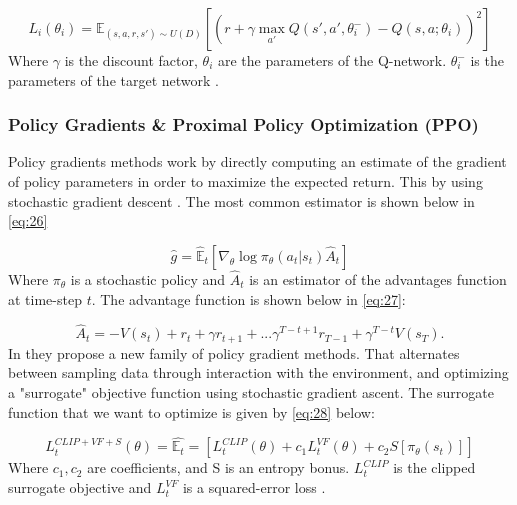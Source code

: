 \documentclass{kththesis}
\theoremstyle{definition}
\begin{document}
\begin{equation}
    \label{eq:25}
    L_i(\theta_i) = \mathbb{E}_{(s,a,r,s') \sim U(D)} \left[\left(r+ \gamma \underset{a'}{\operatorname{max}}Q(s', a', \theta_{i}^{-})-Q(s,a;\theta_i)  \right)^2 \right]
\end{equation}
Where $\gamma$ is the discount factor, $\theta_i$ are the parameters of the Q-network. $\theta_{i}^{-}$ is the parameters of the target network \parencite{mnih2015human}.


\subsubsection*{Policy Gradients \& Proximal Policy Optimization (PPO)}
Policy gradients methods work by directly computing an estimate of the gradient of policy parameters in order to maximize the expected return. This by using stochastic gradient descent \parencite{bansal2017emergent, schulman2017proximal}. The most common estimator is shown below in \autoref{eq:26}

\begin{equation}
    \label{eq:26}
    \hat{g} = \hat{\mathbb{E}}_{t}\left[\nabla_{\theta} \log{\pi_{\theta}(a_t|s_t)\hat{A}_{t}} \right]
\end{equation}
Where $\pi_{\theta}$ is a stochastic policy and $\hat{A}_{t}$ is an estimator of the advantages function at time-step $t$. The advantage function is shown below in \autoref{eq:27}:

\begin{equation}
    \label{eq:27}
    \hat{A}_{t} = -V(s_t) + r_t +\gamma r_{t+1} + ... \gamma^{T-t+1} r_{T-1} + \gamma^{T-t}V(s_T).
\end{equation}
In \textcite{schulman2017proximal} they propose a new family of policy gradient methods. That alternates between sampling data through interaction with the environment, and optimizing a "surrogate" objective function using stochastic gradient ascent.  The surrogate function that we want to optimize is given by \autoref{eq:28} below: 

\begin{equation}
    \label{eq:28}
    L_{t}^{CLIP + VF+ S}(\theta) = \hat{\mathbb{E}_{t}} = \left[L_{t}^{CLIP}(\theta) + c_1 L_{t}^{VF}(\theta) + c_2S[\pi_{\theta}(s_t)]\right]
\end{equation}
Where $c_1,c_2$ are coefficients, and S is an entropy bonus. $L_{t}^{CLIP}$ is the clipped surrogate objective and $L_{t}^{VF}$ is a squared-error loss \parencite{schulman2017proximal}.
\end{document}
